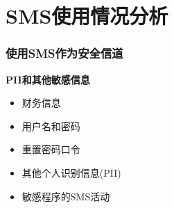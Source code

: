 \documentclass{beamer}
\begin{document}
\section[分析]{SMS使用情况分析}


\begin{frame}
\frametitle{\textbf{使用SMS作为安全信道}}
\begin{block}{\textbf{PII和其他敏感信息}}
\begin{itemize}
    \item 财务信息
    \item 用户名和密码
    \item 重置密码口令
    \item 其他个人识别信息(PII)
    \item 敏感程序的SMS活动
\end{itemize}
\end{block}
\end{frame}
\end{document}

